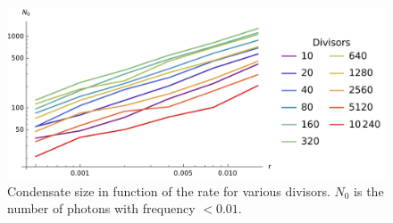 \documentclass[a4paper,12pt,reqno,superscriptaddress,nofootinbib]{revtex4}
\theoremstyle{plain}
\theoremstyle{definition}
\theoremstyle{remark}
\newcommand{\0}{^{(0)}}
\newcommand{\1}{^{(1)}}
\newcommand{\2}{^{(2)}}
\begin{document}
%	
%	

\begin{figure}
	\includegraphics[width=\textwidth]{near-divisors.pdf}
	\caption{Condensate size in function of the rate for various divisors. $N_0$ is the number of photons with frequency $< 0.01$.}\label{fig:near-divisors}
\end{figure}
\end{document}
